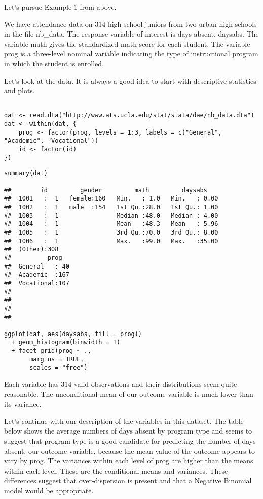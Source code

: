 Let's pursue Example 1 from above.

We have attendance data on 314 high school juniors from two urban high schools in the file nb_data. The response variable of interest is days absent, daysabs. The variable math gives the standardized math score for each student. The variable prog is a three-level nominal variable indicating the type of instructional program in which the student is enrolled.

Let's look at the data. It is always a good idea to start with descriptive statistics and plots.

\begin{framed}
\begin{verbatim}

dat <- read.dta("http://www.ats.ucla.edu/stat/stata/dae/nb_data.dta")
dat <- within(dat, {
	prog <- factor(prog, levels = 1:3, labels = c("General", "Academic", "Vocational"))
	id <- factor(id)
})
\end{verbatim}
\end{framed}
\begin{verbatim}
summary(dat)

##        id         gender         math         daysabs     
##  1001   :  1   female:160   Min.   : 1.0   Min.   : 0.00  
##  1002   :  1   male  :154   1st Qu.:28.0   1st Qu.: 1.00  
##  1003   :  1                Median :48.0   Median : 4.00  
##  1004   :  1                Mean   :48.3   Mean   : 5.96  
##  1005   :  1                3rd Qu.:70.0   3rd Qu.: 8.00  
##  1006   :  1                Max.   :99.0   Max.   :35.00  
##  (Other):308                                              
##          prog    
##  General   : 40  
##  Academic  :167  
##  Vocational:107  
##                  
##                  
##                  
## 

ggplot(dat, aes(daysabs, fill = prog)) 
  + geom_histogram(binwidth = 1) 
  + facet_grid(prog ~ ., 
       margins = TRUE, 
       scales = "free")

\end{verbatim}



Each variable has 314 valid observations and their distributions seem quite reasonable. The unconditional mean of our outcome variable is much lower than its variance. 

Let's continue with our description of the variables in this dataset. The table below shows the average numbers of days absent by program type and seems to suggest that program type is a good candidate for predicting the number of days absent, our outcome variable, because the mean value of the outcome appears to vary by prog. The variances within each level of prog are higher than the means within each level. These are the conditional means and variances. These differences suggest that over-dispersion is present and that a Negative Binomial model would be appropriate. 



